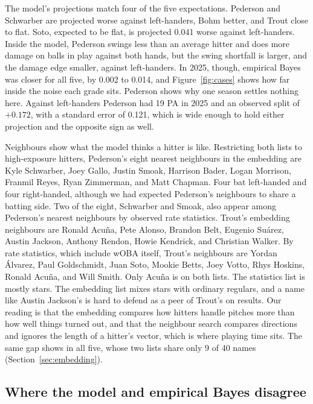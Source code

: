 \documentclass[11pt,letterpaper]{article}
\begin{document}
The model's projections match four of the five expectations. Pederson and Schwarber are projected worse against left-handers, Bohm better, and Trout close to flat. Soto, expected to be flat, is projected 0.041 worse against left-handers. Inside the model, Pederson swings less than an average hitter and does more damage on balls in play against both hands, but the swing shortfall is larger, and the damage edge smaller, against left-handers. In 2025, though, empirical Bayes was closer for all five, by 0.002 to 0.014, and Figure~\ref{fig:cases} shows how far inside the noise each grade sits. Pederson shows why one season settles nothing here. Against left-handers Pederson had 19 PA in 2025 and an observed split of $+0.172$, with a standard error of 0.121, which is wide enough to hold either projection and the opposite sign as well.

Neighbours show what the model thinks a hitter is like. Restricting both lists to high-exposure hitters, Pederson's eight nearest neighbours in the embedding are Kyle Schwarber, Joey Gallo, Justin Smoak, Harrison Bader, Logan Morrison, Franmil Reyes, Ryan Zimmerman, and Matt Chapman. Four bat left-handed and four right-handed, although we had expected Pederson's neighbours to share a batting side. Two of the eight, Schwarber and Smoak, also appear among Pederson's nearest neighbours by observed rate statistics. Trout's embedding neighbours are Ronald Acuña, Pete Alonso, Brandon Belt, Eugenio Suárez, Austin Jackson, Anthony Rendon, Howie Kendrick, and Christian Walker. By rate statistics, which include wOBA itself, Trout's neighbours are Yordan Álvarez, Paul Goldschmidt, Juan Soto, Mookie Betts, Joey Votto, Rhys Hoskins, Ronald Acuña, and Will Smith. Only Acuña is on both lists. The statistics list is mostly stars. The embedding list mixes stars with ordinary regulars, and a name like Austin Jackson's is hard to defend as a peer of Trout's on results. Our reading is that the embedding compares how hitters handle pitches more than how well things turned out, and that the neighbour search compares directions and ignores the length of a hitter's vector, which is where playing time sits. The same gap shows in all five, whose two lists share only 9 of 40 names (Section~\ref{sec:embedding}).

\subsection{Where the model and empirical Bayes disagree}
\label{sec:disagree}
\end{document}
